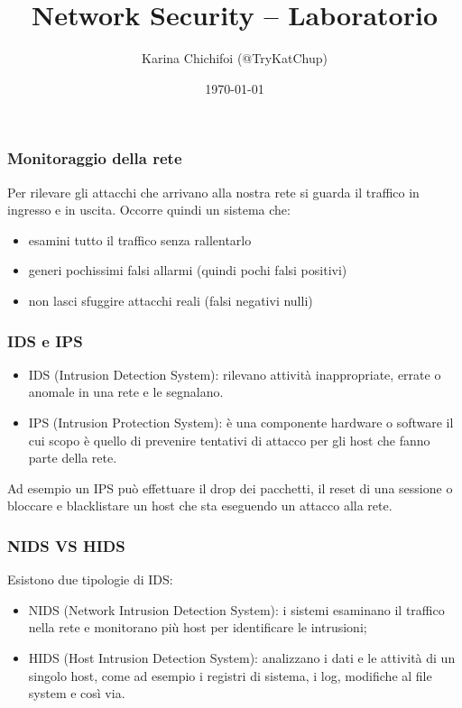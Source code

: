 \documentclass[aspectratio=169]{beamer}
\title{Network Security -- Laboratorio}
\author{Karina Chichifoi (@TryKatChup)}
\date{\today}
\begin{document}
 	\maketitle

	\begin{frame}
		\frametitle{Monitoraggio della rete}
		Per rilevare gli attacchi che arrivano alla nostra rete si guarda il traffico in ingresso e in uscita. Occorre quindi un sistema che:
		\begin{itemize}
		    \item esamini tutto il traffico senza rallentarlo
		    \item generi pochissimi falsi allarmi (quindi pochi falsi positivi)
		    \item non lasci sfuggire attacchi reali (falsi negativi nulli)
		\end{itemize}
	\end{frame}

	\begin{frame}
		\frametitle{IDS e IPS}
	    \begin{itemize}
	        \item IDS (Intrusion Detection System): rilevano attività inappropriate, errate o anomale in una rete e le segnalano.
	        \item IPS (Intrusion Protection System): è una componente hardware o software il cui scopo è quello di prevenire tentativi di attacco per gli host che fanno parte della rete.
	    \end{itemize}
	    Ad esempio un IPS può effettuare il drop dei pacchetti, il reset di una sessione o bloccare e blacklistare un host che sta eseguendo un attacco alla rete.
	\end{frame} 
    
    \begin{frame}
        \frametitle{NIDS VS HIDS}
        Esistono due tipologie di IDS:
        \begin{itemize}
            \item NIDS (Network Intrusion Detection System): i sistemi esaminano il traffico nella rete e monitorano più host per identificare le intrusioni;
            \item HIDS (Host Intrusion Detection System): analizzano i dati e le attività di un singolo host, come ad esempio i registri di sistema, i log, modifiche al file system e così via.
        \end{itemize}
    \end{frame}
    
\end{document}

